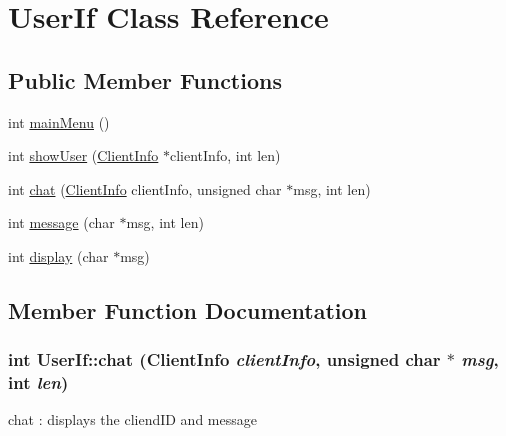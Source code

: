 \hypertarget{classUserIf}{
\section{UserIf Class Reference}
\label{classUserIf}
}
\subsection*{Public Member Functions}
\begin{DoxyCompactItemize}
\item 
int \hyperlink{classUserIf_a2e8d3d8d85a683762f1caa0cac4f9f0c}{mainMenu} ()
\item 
int \hyperlink{classUserIf_a9949473878f6f561d33d068ac5325ad2}{showUser} (\hyperlink{structClientInfo}{ClientInfo} $\ast$clientInfo, int len)
\item 
int \hyperlink{classUserIf_aeb58e62941535f9dc0b0ee80145160e1}{chat} (\hyperlink{structClientInfo}{ClientInfo} clientInfo, unsigned char $\ast$msg, int len)
\item 
int \hyperlink{classUserIf_a7792572195cdb2ced9d74177e45bdc6e}{message} (char $\ast$msg, int len)
\item 
int \hyperlink{classUserIf_a59cf40b6f9ee11f0773ec1939ea42d53}{display} (char $\ast$msg)
\end{DoxyCompactItemize}


\subsection{Member Function Documentation}
\hypertarget{classUserIf_aeb58e62941535f9dc0b0ee80145160e1}{
\subsubsection[{chat}]{\setlength{\rightskip}{0pt plus 5cm}int UserIf::chat ({\bf ClientInfo} {\em clientInfo}, \/  unsigned char $\ast$ {\em msg}, \/  int {\em len})}}
\label{classUserIf_aeb58e62941535f9dc0b0ee80145160e1}
chat : displays the cliendID and message 

